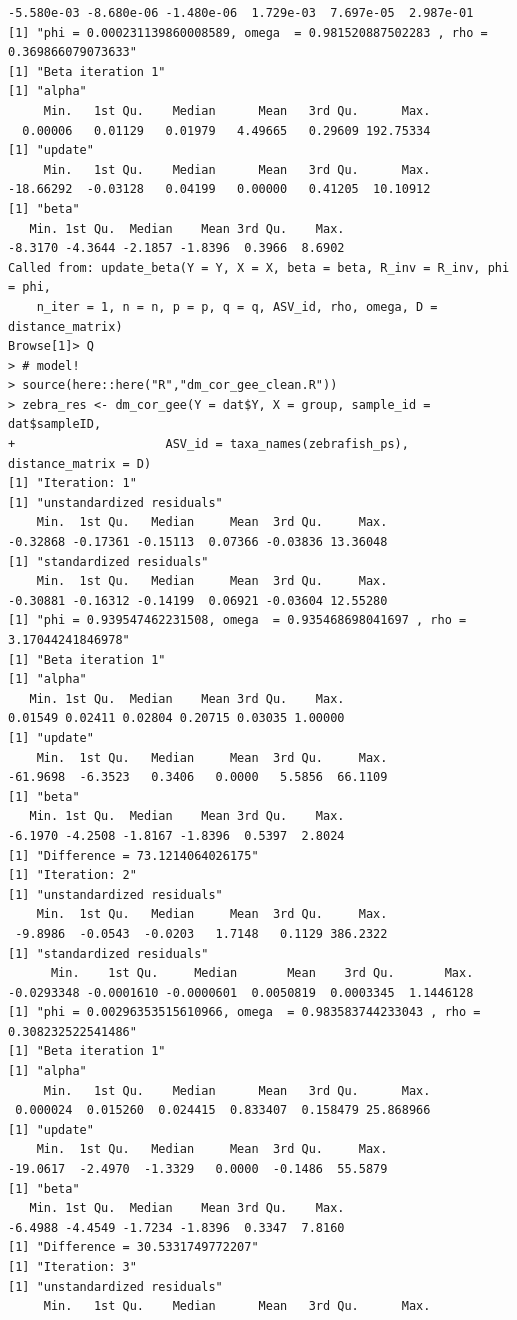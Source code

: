 \documentclass[10pt]{article}
\theoremstyle{definition}
\begin{document}
\begin{itemize}
\begin{verbatim}
-5.580e-03 -8.680e-06 -1.480e-06  1.729e-03  7.697e-05  2.987e-01
[1] "phi = 0.000231139860008589, omega  = 0.981520887502283 , rho = 0.369866079073633"
[1] "Beta iteration 1"
[1] "alpha"
     Min.   1st Qu.    Median      Mean   3rd Qu.      Max.
  0.00006   0.01129   0.01979   4.49665   0.29609 192.75334
[1] "update"
     Min.   1st Qu.    Median      Mean   3rd Qu.      Max.
-18.66292  -0.03128   0.04199   0.00000   0.41205  10.10912
[1] "beta"
   Min. 1st Qu.  Median    Mean 3rd Qu.    Max.
-8.3170 -4.3644 -2.1857 -1.8396  0.3966  8.6902
Called from: update_beta(Y = Y, X = X, beta = beta, R_inv = R_inv, phi = phi,
    n_iter = 1, n = n, p = p, q = q, ASV_id, rho, omega, D = distance_matrix)
Browse[1]> Q
> # model!
> source(here::here("R","dm_cor_gee_clean.R"))
> zebra_res <- dm_cor_gee(Y = dat$Y, X = group, sample_id = dat$sampleID,
+                     ASV_id = taxa_names(zebrafish_ps), distance_matrix = D)
[1] "Iteration: 1"
[1] "unstandardized residuals"
    Min.  1st Qu.   Median     Mean  3rd Qu.     Max.
-0.32868 -0.17361 -0.15113  0.07366 -0.03836 13.36048
[1] "standardized residuals"
    Min.  1st Qu.   Median     Mean  3rd Qu.     Max.
-0.30881 -0.16312 -0.14199  0.06921 -0.03604 12.55280
[1] "phi = 0.939547462231508, omega  = 0.935468698041697 , rho = 3.17044241846978"
[1] "Beta iteration 1"
[1] "alpha"
   Min. 1st Qu.  Median    Mean 3rd Qu.    Max.
0.01549 0.02411 0.02804 0.20715 0.03035 1.00000
[1] "update"
    Min.  1st Qu.   Median     Mean  3rd Qu.     Max.
-61.9698  -6.3523   0.3406   0.0000   5.5856  66.1109
[1] "beta"
   Min. 1st Qu.  Median    Mean 3rd Qu.    Max.
-6.1970 -4.2508 -1.8167 -1.8396  0.5397  2.8024
[1] "Difference = 73.1214064026175"
[1] "Iteration: 2"
[1] "unstandardized residuals"
    Min.  1st Qu.   Median     Mean  3rd Qu.     Max.
 -9.8986  -0.0543  -0.0203   1.7148   0.1129 386.2322
[1] "standardized residuals"
      Min.    1st Qu.     Median       Mean    3rd Qu.       Max.
-0.0293348 -0.0001610 -0.0000601  0.0050819  0.0003345  1.1446128
[1] "phi = 0.00296353515610966, omega  = 0.983583744233043 , rho = 0.308232522541486"
[1] "Beta iteration 1"
[1] "alpha"
     Min.   1st Qu.    Median      Mean   3rd Qu.      Max.
 0.000024  0.015260  0.024415  0.833407  0.158479 25.868966
[1] "update"
    Min.  1st Qu.   Median     Mean  3rd Qu.     Max.
-19.0617  -2.4970  -1.3329   0.0000  -0.1486  55.5879
[1] "beta"
   Min. 1st Qu.  Median    Mean 3rd Qu.    Max.
-6.4988 -4.4549 -1.7234 -1.8396  0.3347  7.8160
[1] "Difference = 30.5331749772207"
[1] "Iteration: 3"
[1] "unstandardized residuals"
     Min.   1st Qu.    Median      Mean   3rd Qu.      Max.

\end{verbatim}
\end{itemize}
\end{document}
